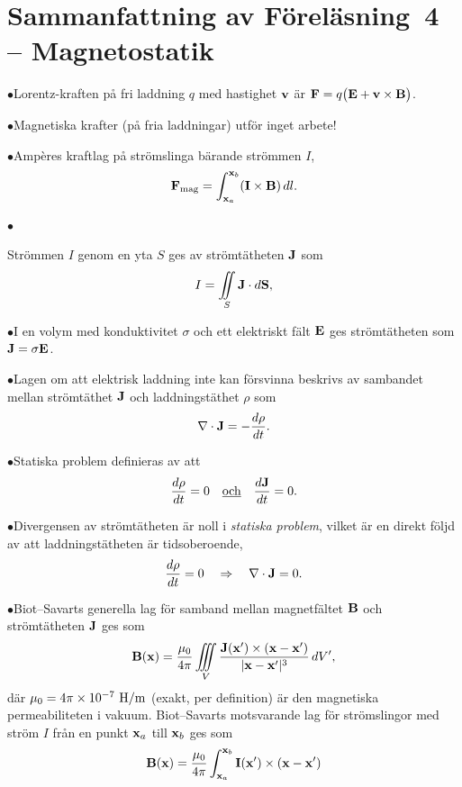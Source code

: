 {\section{Sammanfattning av F{\"o}rel{\"a}sning~4 -- Magnetostatik}
\item{$\bullet$}{Lorentz-kraften p{\aa} fri laddning $q$ med hastighet
  ${\bf v}$ {\"a}r ${\bf F}=q\big({\bf E}+{\bf v}\times{\bf B}\big)$.}
\item{$\bullet$}{Magnetiska krafter (p{\aa} fria laddningar) utf{\"o}r
  inget arbete!}
\item{$\bullet$}{Amp{\`e}res kraftlag p{\aa} str{\"o}mslinga b{\"a}rande
  str{\"o}mmen $I$,
  $$
    {\bf F}_{\rm mag}=\int^{{\bf x}_b}_{{\bf x}_a} ({\bf I}\times{\bf B})\,dl.
  $$}
\item{$\bullet$}{Str{\"o}mmen $I$ genom en yta $S$ ges av str{\"o}mt{\"a}theten
  ${\bf J}$ som
  $$
    I=\iint_S {\bf J}\cdot d{\bf S},
  $$
\item{$\bullet$}{I en volym med konduktivitet $\sigma$ och ett elektriskt
  f{\"a}lt ${\bf E}$ ges str{\"o}mt{\"a}theten som ${\bf J}=\sigma{\bf E}$.}
\item{$\bullet$}{Lagen om att elektrisk laddning inte kan f{\"o}rsvinna
  beskrivs av sambandet mellan str{\"o}mt{\"a}thet ${\bf J}$ och
  laddningst{\"a}thet $\rho$ som
  $$
    \nabla\cdot{\bf J}=-{{d\rho}\over{dt}}.
  $$}
\item{$\bullet$}{Statiska problem definieras av att
  $$
    {{d\rho}\over{dt}}=0\quad\underline{\hbox{och}}\quad{{d{\bf J}}\over{dt}}=0.
  $$}
\item{$\bullet$}{Divergensen av str{\"o}mt{\"a}theten {\"a}r noll i
  {\it statiska problem}, vilket {\"a}r en direkt f{\"o}ljd av att
  laddnings\-t{\"a}t\-heten {\"a}r tidsoberoende,
  $$
    {{d\rho}\over{dt}}=0\quad\Rightarrow\quad\nabla\cdot{\bf J}=0.
  $$}
\item{$\bullet$}{Biot--Savarts generella lag f{\"o}r samband mellan
  magnetf{\"a}ltet ${\bf B}$ och str{\"o}mt{\"a}theten ${\bf J}$ ges som
  $$
    {\bf B}({\bf x})={{\mu_0}\over{4\pi}}\iiint_V
        {{{\bf J}({\bf x}')\times({\bf x}-{\bf x}')}
          \over{|{\bf x}-{\bf x}'|^3}}\,dV',
  $$
  d{\"a}r $\mu_0=4\pi\times10^{-7}\ {\rm H}/{\rm m}$ (exakt, per definition)
  {\"a}r den magnetiska permeabiliteten i vakuum. Biot--Savarts motsvarande
  lag f{\"o}r str{\"o}mslingor med str{\"o}m $I$ fr{\aa}n en punkt ${\bf x}_a$
  till ${\bf x}_b$ ges som
  $$
    {\bf B}({\bf x})={{\mu_0}\over{4\pi}}\int^{{\bf x}_b}_{{\bf x}_a}
        {{{\bf I}({\bf x}')\times({\bf x}-{\bf x}')}
}$$}}}
